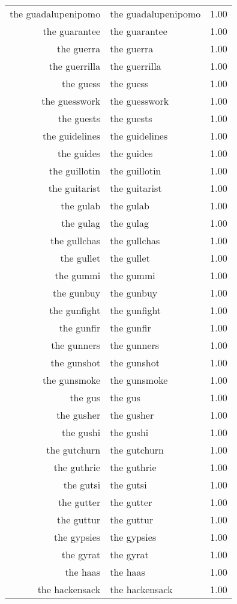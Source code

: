 \begin{table}[ht]
\begin{tabular}{rlr}
  the guadalupenipomo & the guadalupenipomo & 1.00 \\ 
  the guarantee & the guarantee & 1.00 \\ 
  the guerra & the guerra & 1.00 \\ 
  the guerrilla & the guerrilla & 1.00 \\ 
  the guess & the guess & 1.00 \\ 
  the guesswork & the guesswork & 1.00 \\ 
  the guests & the guests & 1.00 \\ 
  the guidelines & the guidelines & 1.00 \\ 
  the guides & the guides & 1.00 \\ 
  the guillotin & the guillotin & 1.00 \\ 
  the guitarist & the guitarist & 1.00 \\ 
  the gulab & the gulab & 1.00 \\ 
  the gulag & the gulag & 1.00 \\ 
  the gullchas & the gullchas & 1.00 \\ 
  the gullet & the gullet & 1.00 \\ 
  the gummi & the gummi & 1.00 \\ 
  the gunbuy & the gunbuy & 1.00 \\ 
  the gunfight & the gunfight & 1.00 \\ 
  the gunfir & the gunfir & 1.00 \\ 
  the gunners & the gunners & 1.00 \\ 
  the gunshot & the gunshot & 1.00 \\ 
  the gunsmoke & the gunsmoke & 1.00 \\ 
  the gus & the gus & 1.00 \\ 
  the gusher & the gusher & 1.00 \\ 
  the gushi & the gushi & 1.00 \\ 
  the gutchurn & the gutchurn & 1.00 \\ 
  the guthrie & the guthrie & 1.00 \\ 
  the gutsi & the gutsi & 1.00 \\ 
  the gutter & the gutter & 1.00 \\ 
  the guttur & the guttur & 1.00 \\ 
  the gypsies & the gypsies & 1.00 \\ 
  the gyrat & the gyrat & 1.00 \\ 
  the haas & the haas & 1.00 \\ 
  the hackensack & the hackensack & 1.00 \\ 

\end{tabular}
\end{table}
